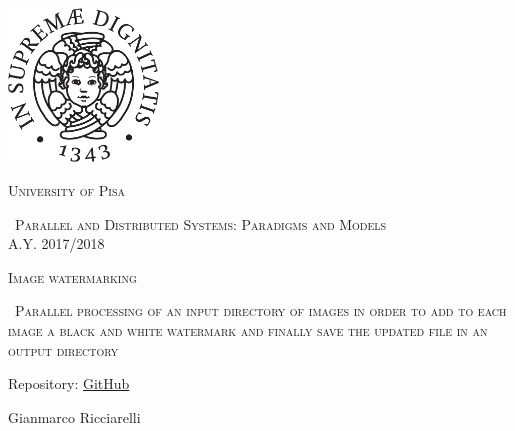 \begin{titlepage}
  \centering
  \includegraphics[width=0.30\textwidth]{imgs/cherubino_black.pdf}\par\vspace{1cm}
  {\scshape\LARGE University of Pisa \par}
  \vspace{1cm}
  {\scshape\ Parallel and Distributed Systems: Paradigms and Models \\A.Y. 2017/2018\par}
  \vspace{1.5cm}
  {\scshape \Huge Image watermarking \par}
  {\vspace{1.5cm}}
  {\scshape\ Parallel processing of an input directory of images in order to add to each image a black and white
  watermark and finally save the updated file in an output directory \par}
  \vspace{1cm}
  {\Large Repository: \href{https://github.com/germz01/PDS_project}{GitHub}\par}
  \vfill
  {\Large Gianmarco Ricciarelli\par}
\end{titlepage}
